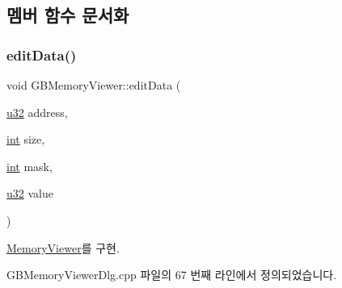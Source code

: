 \subsection{멤버 함수 문서화}
\mbox{\label{class_g_b_memory_viewer_ada4ac6d60aab7d4169b8809cf7fe7e1e}} 
\subsubsection{\texorpdfstring{edit\+Data()}{editData()}}
{\footnotesize\ttfamily void G\+B\+Memory\+Viewer\+::edit\+Data (\begin{DoxyParamCaption}\item[{\mbox{\hyperlink{_system_8h_a10e94b422ef0c20dcdec20d31a1f5049}{u32}}}]{address,  }\item[{\mbox{\hyperlink{_util_8cpp_a0ef32aa8672df19503a49fab2d0c8071}{int}}}]{size,  }\item[{\mbox{\hyperlink{_util_8cpp_a0ef32aa8672df19503a49fab2d0c8071}{int}}}]{mask,  }\item[{\mbox{\hyperlink{_system_8h_a10e94b422ef0c20dcdec20d31a1f5049}{u32}}}]{value }\end{DoxyParamCaption})\hspace{0.3cm}{\ttfamily [virtual]}}



\mbox{\hyperlink{class_memory_viewer_a07778cf336e9f145a6403849407fb72d}{Memory\+Viewer}}를 구현.



G\+B\+Memory\+Viewer\+Dlg.\+cpp 파일의 67 번째 라인에서 정의되었습니다.


